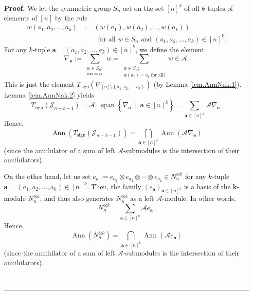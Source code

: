 \documentclass[numbers=enddot,12pt,final,onecolumn,notitlepage]{scrartcl}%
\numberwithin{exer}{subsection}
\theoremstyle{definition}
\newenvironment{proof}[1][Proof]{\noindent\textbf{#1.} }{\ \rule{0.5em}{0.5em}}
\let\sumnonlimits\sum
\let\capnonlimits\bigcap
\renewcommand{\sum}{\sumnonlimits\limits}
\renewcommand{\bigcap}{\capnonlimits\limits}
\begin{document}
\begin{proof}
We let the symmetric group $S_{n}$ act on the set $\left[  n\right]  ^{k}$ of
all $k$-tuples of elements of $\left[  n\right]  $ by the rule%
\begin{align*}
w\left(  a_{1},a_{2},\ldots,a_{k}\right)   &  :=\left(  w\left(  a_{1}\right)
,w\left(  a_{2}\right)  ,\ldots,w\left(  a_{k}\right)  \right) \\
&  \ \ \ \ \ \ \ \ \ \ \text{for all }w\in S_{n}\text{ and }\left(
a_{1},a_{2},\ldots,a_{k}\right)  \in\left[  n\right]  ^{k}.
\end{align*}
For any $k$-tuple $\mathbf{a}=\left(  a_{1},a_{2},\ldots,a_{k}\right)
\in\left[  n\right]  ^{k}$, we define the element%
\[
\nabla_{\mathbf{a}}:=\sum_{\substack{w\in S_{n};\\w\mathbf{a}=\mathbf{a}%
}}w=\sum_{\substack{w\in S_{n};\\w\left(  a_{i}\right)  =a_{i}\text{ for all
}i}}w\in\mathcal{A}.
\]
This is just the element $T_{\operatorname*{sign}}\left(  \nabla_{\left[
n\right]  \setminus\left\{  a_{1},a_{2},\ldots,a_{k}\right\}  }^{-}\right)  $
(by Lemma \ref{lem.AnnNnk.1}). Lemma \ref{lem.AnnNnk.2} yields%
\[
T_{\operatorname*{sign}}\left(  \mathcal{J}_{n-k-1}\right)  =\mathcal{A}%
\cdot\operatorname*{span}\left\{  \nabla_{\mathbf{a}}\ \mid\ \mathbf{a}%
\in\left[  n\right]  ^{k}\right\}  =\sum_{\mathbf{a}\in\left[  n\right]  ^{k}%
}\mathcal{A}\nabla_{\mathbf{a}}.
\]
Hence,%
\begin{equation}
\operatorname*{Ann}\left(  T_{\operatorname*{sign}}\left(  \mathcal{J}%
_{n-k-1}\right)  \right)  =\bigcap_{\mathbf{a}\in\left[  n\right]  ^{k}%
}\operatorname*{Ann}\left(  \mathcal{A}\nabla_{\mathbf{a}}\right)
\label{pf.thm.AnnNnk.Ann12}%
\end{equation}
(since the annihilator of a sum of left $\mathcal{A}$-submodules is the
intersection of their annihilators).

On the other hand, let us set $e_{\mathbf{a}}:=e_{a_{1}}\otimes e_{a_{2}%
}\otimes\cdots\otimes e_{a_{k}}\in N_{n}^{\otimes k}$ for any $k$-tuple
$\mathbf{a}=\left(  a_{1},a_{2},\ldots,a_{k}\right)  \in\left[  n\right]
^{k}$. Then, the family $\left(  e_{\mathbf{a}}\right)  _{\mathbf{a}\in\left[
n\right]  ^{k}}$ is a basis of the $\mathbf{k}$-module $N_{n}^{\otimes k}$,
and thus also generates $N_{n}^{\otimes k}$ as a left $\mathcal{A}$-module. In
other words,%
\[
N_{n}^{\otimes k}=\sum_{\mathbf{a}\in\left[  n\right]  ^{k}}\mathcal{A}%
e_{\mathbf{a}}.
\]
Hence,%
\begin{equation}
\operatorname*{Ann}\left(  N_{n}^{\otimes k}\right)  =\bigcap_{\mathbf{a}%
\in\left[  n\right]  ^{k}}\operatorname*{Ann}\left(  \mathcal{A}e_{\mathbf{a}%
}\right)  \label{pf.thm.AnnNnk.Ann22}%
\end{equation}
(since the annihilator of a sum of left $\mathcal{A}$-submodules is the
intersection of their annihilators).


\end{proof}
\end{document}
